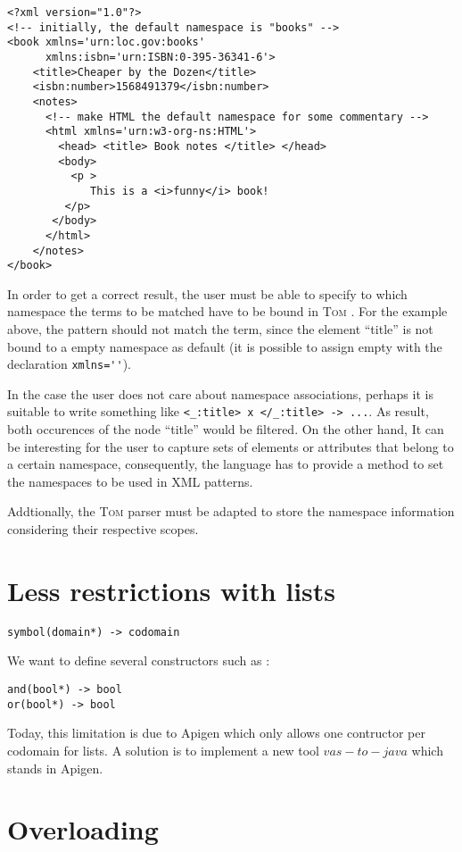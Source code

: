 \documentclass{article}
\newcommand{\tom}{\textsc{Tom} }
\begin{document}
\begin{verbatim}
<?xml version="1.0"?>
<!-- initially, the default namespace is "books" -->
<book xmlns='urn:loc.gov:books'
      xmlns:isbn='urn:ISBN:0-395-36341-6'>
    <title>Cheaper by the Dozen</title>
    <isbn:number>1568491379</isbn:number>
    <notes>
      <!-- make HTML the default namespace for some commentary -->
      <html xmlns='urn:w3-org-ns:HTML'>
        <head> <title> Book notes </title> </head>
        <body>
          <p >
             This is a <i>funny</i> book!
         </p>
       </body>
      </html> 
    </notes>
</book>
\end{verbatim}

In order to get a correct result, the user must be able to specify to which namespace the terms to be matched have to be bound in \tom. For the example above, the pattern should not match the term, since the element ``title'' is not bound to a empty namespace as default (it is possible to assign empty with the declaration \verb$xmlns=''$). 

In the case the user does not care about namespace associations, perhaps it is suitable to write something like \verb$<_:title> x </_:title> -> ...$. As result, both occurences of the node ``title'' would be filtered. On the other hand, It can be interesting for the user to capture sets of elements or attributes that belong to a certain namespace, consequently, the language has to provide a method to set the namespaces to be used in XML patterns. 

Addtionally, the \tom parser must be adapted to store the namespace information considering their respective scopes.

\section{Less restrictions with lists}
\begin{verbatim}
symbol(domain*) -> codomain
\end{verbatim}
We want to define several constructors such as :
\begin{verbatim}
and(bool*) -> bool
or(bool*) -> bool
\end{verbatim}
Today, this limitation is due to Apigen which only allows one contructor per codomain for lists.
A solution is to implement a new tool $vas-to-java$ which stands in Apigen.

\section{Overloading}
\end{document}
